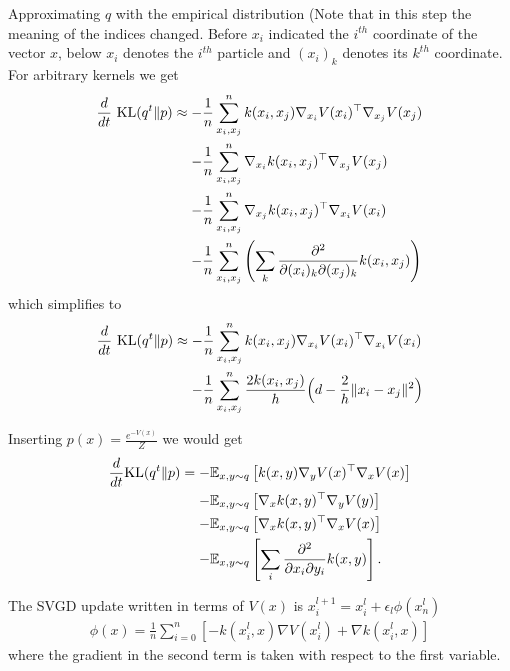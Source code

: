 \documentclass{article}
\begin{document}
    Approximating $q$ with the empirical distribution
    (Note that in this step the meaning of the indices changed. Before $x_i$ indicated the $i^{th}$
    coordinate of the vector $x$, below $x_i$ denotes the $i^{th}$ particle and $(x_i)_k$ denotes
    its $k^{th}$ coordinate.
    For arbitrary kernels we get
    \begin{align}
        \frac{d}{dt}\ \textrm{KL}( q^t \| p ) \approx -& \frac{1}{n}\sum_{x_i,x_j}^n  k(x_i,x_j) \nabla_{x_i} V(x_i)^\top \nabla_{x_j} V(x_j)  \\ 
        -& \frac{1}{n}\sum_{x_i,x_j}^n  \nabla_{x_i} k(x_i,x_j)^\top \nabla_{x_j} V(x_j)  \\ 
        -& \frac{1}{n}\sum_{x_i,x_j}^n  \nabla_{x_j} k(x_i,x_j)^\top \nabla_{x_i} V(x_i)  \\ 
        -& \frac{1}{n}\sum_{x_i,x_j}^n \left( \sum_k \frac{ \partial^2 }{ \partial (x_i)_k \partial (x_j)_k } 
            k(x_i,x_j) \right)
    \end{align}
    which simplifies to 
    \begin{align}
        \frac{d}{dt}\ \textrm{KL}( q^t \| p ) \approx -& \frac{1}{n}\sum_{x_i,x_j}^n  k(x_i,x_j) \nabla_{x_i} V(x_i)^\top \nabla_{x_i} V(x_i)  \\ 
        -& \frac{1}{n}\sum_{x_i,x_j}^n \frac{2k(x_i, x_j)}{h}\Big( d - \frac{2}{h} \|x_i - x_j\|^2 \Big)
    \end{align} 

    Inserting $p(x) = \frac{e^{-V(x)}}{Z}$ we would get
    \begin{align}
        \frac{d}{dt} \text{\textrm{KL}}( q^t \| p ) =
        -& \mathbb{E}_{x,y\sim q} \left[ k(x,y) \nabla_y V(x)^\top \nabla_x V(x) \right] \\ 
        -& \mathbb{E}_{x,y\sim q} \left[ \nabla_x k(x,y)^\top \nabla_y V(y) \right] \\ 
        -& \mathbb{E}_{x,y\sim q} \left[ \nabla_x k(x,y)^\top \nabla_x V(x) \right] \\ 
        -& \mathbb{E}_{x,y\sim q} \left[ \sum_i \frac{ \partial^2 }{ \partial x_i \partial y_i } k(x,y) \right]
        .
    \end{align}

    The SVGD update written in terms of $V(x)$ is $x_i^{l+1} = x_i^l + \epsilon_l \phi(x_n^l)$
    \begin{align}
        \phi(x) = \frac{1}{n} \sum_{i=0}^{n} \left[
            - k(x_i^l, x) \nabla V(x_i^l) + \nabla k(x_i^l, x)
        \right]
    \end{align}
    where the gradient in the second term is taken with respect to the first variable.
\end{document}
